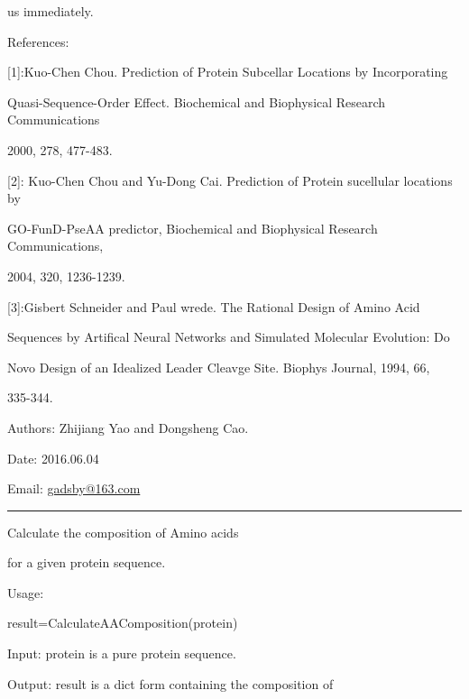 \documentclass[letterpaper,10pt,english]{sphinxmanual}
\begin{document}
us immediately.

References:

{[}1{]}:Kuo-Chen Chou. Prediction of Protein Subcellar Locations by Incorporating

Quasi-Sequence-Order Effect. Biochemical and Biophysical Research Communications

2000, 278, 477-483.

{[}2{]}: Kuo-Chen Chou and Yu-Dong Cai. Prediction of Protein sucellular locations by

GO-FunD-PseAA predictor, Biochemical and Biophysical Research Communications,

2004, 320, 1236-1239.

{[}3{]}:Gisbert Schneider and Paul wrede. The Rational Design of Amino Acid

Sequences by Artifical Neural Networks and Simulated Molecular Evolution: Do

Novo Design of an Idealized Leader Cleavge Site. Biophys Journal, 1994, 66,

335-344.

Authors: Zhijiang Yao and Dongsheng Cao.

Date: 2016.06.04

Email: \href{mailto:gadsby@163.com}{gadsby@163.com}


\bigskip\hrule{}\bigskip


\begin{fulllineitems}
\label{reference/QuasiSequenceOrder:QuasiSequenceOrder.GetAAComposition}
Calculate the composition of Amino acids

for a given protein sequence.

Usage:

result=CalculateAAComposition(protein)

Input: protein is a pure protein sequence.

Output: result is a dict form containing the composition of

\end{fulllineitems}

\end{document}
